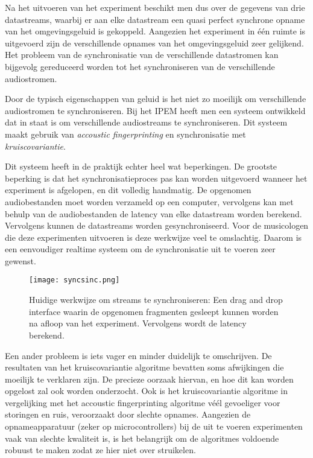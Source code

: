 Na het uitvoeren van het experiment beschikt men dus over de gegevens van drie datastreams, waarbij er aan elke datastream een quasi perfect synchrone opname van het omgevingsgeluid is gekoppeld. Aangezien het experiment in één ruimte is uitgevoerd zijn de verschillende opnames van het omgevingsgeluid zeer gelijkend. Het probleem van de synchronisatie van de verschillende datastromen kan bijgevolg gereduceerd worden tot het synchroniseren van de verschillende audiostromen.

Door de typisch eigenschappen van geluid is het niet zo moeilijk om verschillende audiostromen te synchroniseren. Bij het IPEM heeft men een systeem ontwikkeld dat in staat is om verschillende audiostreams te synchroniseren. Dit systeem maakt gebruik van \textit{accoustic fingerprinting} en synchronisatie met \textit{kruiscovariantie}.

Dit systeem heeft in de praktijk echter heel wat beperkingen. De grootste beperking is dat het synchronisatieproces pas kan worden uitgevoerd wanneer het experiment is afgelopen, en dit volledig handmatig. De opgenomen audiobestanden moet worden verzameld op een computer, vervolgens kan met behulp van de audiobestanden de latency van elke datastream worden berekend. Vervolgens kunnen de datastreams worden gesynchroniseerd. Voor de musicologen die deze experimenten uitvoeren is deze werkwijze veel te omslachtig. Daarom is een eenvoudiger realtime systeem om de synchronisatie uit te voeren zeer gewenst.

\begin{figure}[!h]
	\captionsetup{width=0.7\textwidth}
	\centering
	\texttt{[image: syncsinc.png]}
	\caption[Huidge werkwijze voor streamsynchronisatie]{Huidige werkwijze om streams te synchroniseren: Een drag and drop interface waarin de opgenomen fragmenten gesleept kunnen worden na afloop van het experiment. Vervolgens wordt de latency berekend.}
\end{figure}


Een ander probleem is iets vager en minder duidelijk te omschrijven. De resultaten van het kruiscovariantie algoritme bevatten soms afwijkingen die moeilijk te verklaren zijn. De precieze oorzaak hiervan, en hoe dit kan worden opgelost zal ook worden onderzocht. Ook is het kruiscovariantie algoritme in vergelijking met het accoustic fingerprinting algoritme véél gevoeliger voor storingen en ruis, veroorzaakt door slechte opnames. Aangezien de opnameapparatuur (zeker op microcontrollers) bij de uit te voeren experimenten vaak van slechte kwaliteit is, is het belangrijk om de algoritmes voldoende robuust te maken zodat ze hier niet over struikelen.\\

